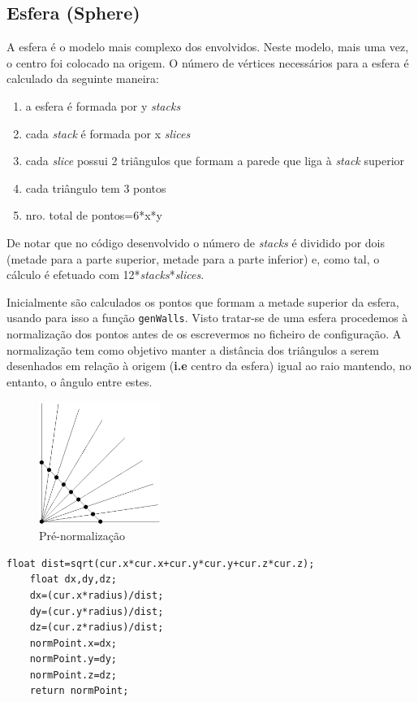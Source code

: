 \documentclass{article}
\begin{document}
\subsection{Esfera (Sphere)}
A esfera é o modelo mais complexo dos envolvidos. Neste modelo, mais uma vez, o centro foi colocado na origem. O número de vértices necessários para a esfera é calculado da seguinte maneira:
\begin{enumerate}
    \item a esfera é formada por y \textit{stacks}
    \item cada \textit{stack} é formada por x \textit{slices}
    \item cada \textit{slice} possui 2 triângulos que formam a parede que liga à \textit{stack} superior
    \item cada triângulo tem 3 pontos
    \item nro. total de pontos=6*x*y
\end{enumerate}

De notar que no código desenvolvido o número de \textit{stacks} é dividido por dois (metade para a parte superior, metade para a parte inferior) e, como tal, o cálculo é efetuado com 12*\textit{stacks}*\textit{slices}.


Inicialmente são calculados os pontos que formam a metade superior da esfera, usando para isso a função \texttt{genWalls}. Visto tratar-se de uma esfera procedemos à normalização dos pontos antes de os escrevermos no ficheiro de configuração. A normalização tem como objetivo manter a distância dos triângulos a serem desenhados em relação à origem (\textbf{i.e} centro da esfera) igual ao raio mantendo, no entanto, o ângulo entre estes.

\begin{figure}[H]
    \centering
    \includegraphics[height=4cm]{beforeNorm.png}
    \caption{Pré-normalização}
\end{figure}

\begin{Verbatim}[fontsize=\small]    
    float dist=sqrt(cur.x*cur.x+cur.y*cur.y+cur.z*cur.z);
    float dx,dy,dz;
    dx=(cur.x*radius)/dist;
    dy=(cur.y*radius)/dist;
    dz=(cur.z*radius)/dist;
    normPoint.x=dx;
    normPoint.y=dy;
    normPoint.z=dz;
    return normPoint;
\end{Verbatim}
\end{document}
